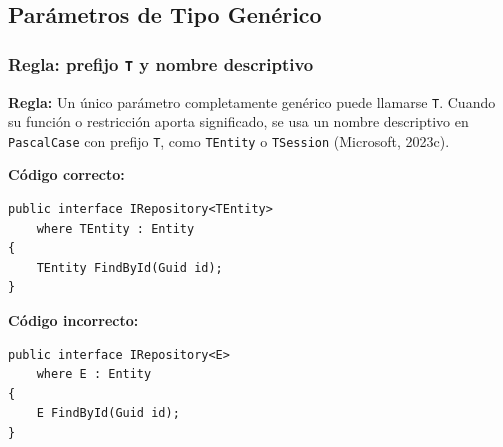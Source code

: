 \subsection{Parámetros de Tipo Genérico}

\subsubsection{Regla: prefijo \texttt{T} y nombre descriptivo}

\textbf{Regla:} Un único parámetro completamente genérico puede llamarse \texttt{T}. Cuando su función o restricción aporta significado, se usa un nombre descriptivo en \texttt{PascalCase} con prefijo \texttt{T}, como \texttt{TEntity} o \texttt{TSession} (Microsoft, 2023c).

\textbf{Código correcto:}
\begin{lstlisting}[style=csharpstyle]
public interface IRepository<TEntity>
    where TEntity : Entity
{
    TEntity FindById(Guid id);
}
\end{lstlisting}

\textbf{Código incorrecto:}
\begin{lstlisting}[style=csharpstyle]
public interface IRepository<E>
    where E : Entity
{
    E FindById(Guid id);
}
\end{lstlisting}
